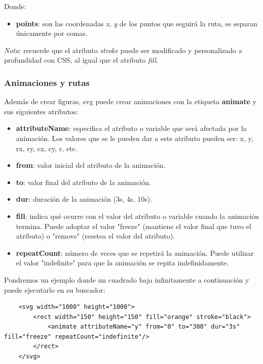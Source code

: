 Donde:
\begin{itemize}
    \item \textbf{points}: son las coordenadas \textit{x}, \textit{y} de los puntos que seguirá la ruta, se separan únicamente por comas.
\end{itemize}

\textit{Nota}: recuerde que el atributo \textit{stroke} puede ser modificado y personalizado a profundidad con CSS, al igual que el atributo \textit{fill}.


\subsubsection{Animaciones y rutas}

Además de crear figuras, svg puede crear animaciones con la etiqueta \textbf{animate} y sus siguientes atributos:
\begin{itemize}
    \item \textbf{attributeName}: especifica el atributo o variable que será afectada por la animación. Los valores que se le pueden dar a este atributo pueden ser: x, y, rx, ry, cx, cy, r, etc.
    \item \textbf{from}: valor inicial del atributo de la animación.
    \item \textbf{to}: valor final del atributo de la animación.
    \item \textbf{dur}: duración de la animación (3s, 4s, 10s).
    \item \textbf{fill}: indica qué ocurre con el valor del atributo o variable cuando la animación termina. Puede adoptar el valor "freeze" (mantiene el valor final que tuvo el atributo) o "remove" (resetea el valor del atributo).
    \item \textbf{repeatCount}: número de veces que se repetirá la animación. Puede utilizar el valor "indefinite" para que la animación se repita indefinidamente.
\end{itemize}

Pondremos un ejemplo donde un cuadrado baja infinitamente a continuación y puede ejecutarlo en su buscador:
\begin{lstlisting}
    <svg width="1000" height="1000">
        <rect width="150" height="150" fill="orange" stroke="black">
            <animate attributeName="y" from="0" to="300" dur="3s" fill="freeze" repeatCount="indefinite"/> 
        </rect>
    </svg>
\end{lstlisting}

